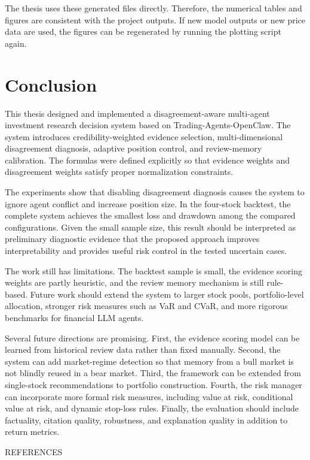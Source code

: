 \documentclass[14pt,a4paper]{extarticle}
\newcommand{\MajorHeadingToc}[1]{%
  \clearpage
  \phantomsection
  \addcontentsline{toc}{section}{#1}
  \begin{center}
    \normalfont\normalsize #1
  \end{center}
  \vspace{1.5\baselineskip}
}
\begin{document}
The thesis uses these generated files directly. Therefore, the numerical tables and figures are consistent with the project outputs. If new model outputs or new price data are used, the figures can be regenerated by running the plotting script again.

\section{Conclusion}

This thesis designed and implemented a disagreement-aware multi-agent investment research decision system based on Trading-Agents-OpenClaw. The system introduces credibility-weighted evidence selection, multi-dimensional disagreement diagnosis, adaptive position control, and review-memory calibration. The formulas were defined explicitly so that evidence weights and disagreement weights satisfy proper normalization constraints.

The experiments show that disabling disagreement diagnosis causes the system to ignore agent conflict and increase position size. In the four-stock backtest, the complete system achieves the smallest loss and drawdown among the compared configurations. Given the small sample size, this result should be interpreted as preliminary diagnostic evidence that the proposed approach improves interpretability and provides useful risk control in the tested uncertain cases.

The work still has limitations. The backtest sample is small, the evidence scoring weights are partly heuristic, and the review memory mechanism is still rule-based. Future work should extend the system to larger stock pools, portfolio-level allocation, stronger risk measures such as VaR and CVaR, and more rigorous benchmarks for financial LLM agents.

Several future directions are promising. First, the evidence scoring model can be learned from historical review data rather than fixed manually. Second, the system can add market-regime detection so that memory from a bull market is not blindly reused in a bear market. Third, the framework can be extended from single-stock recommendations to portfolio construction. Fourth, the risk manager can incorporate more formal risk measures, including value at risk, conditional value at risk, and dynamic stop-loss rules. Finally, the evaluation should include factuality, citation quality, robustness, and explanation quality in addition to return metrics.

\MajorHeadingToc{REFERENCES}
\end{document}
